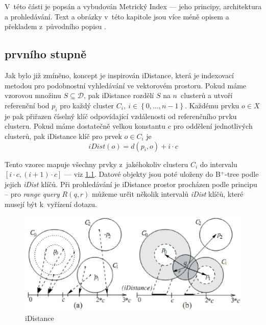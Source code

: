 \chapter{\MIndex{}}

V~této části je popsán a vybudován Metrický Index --- jeho principy, architektura a prohledávání.
Text a obrázky v~této kapitole jsou více méně opisem a překladem z~původního popisu \cite{Novak:2009:MIE:1637863.1638184}.

\section{\MIndex{} prvního stupně}

Jak bylo již zmíněno, koncept  je inspirován iDistance, která je indexovací metodou pro podobnostní vyhledávání ve vektorovém prostoru.
Pokud máme vzorovou množinu $S\subseteq\mathbb{\mathcal{D}}$, pak iDistance rozdělí $S$ na $n$~clusterů a utvoří referenční bod $p_{i}$ pro každý cluster $C_{i},\: i\in\left\{ 0,\ldots,n-1\right\} $.
Každému prvku $o\in X$ je pak přiřazen číselný klíč odpovídající vzdálenosti od referenčního prvku clusteru.
Pokud máme dostatečně velkou konstantu $c$ pro oddělení jednotlivých clusterů, pak iDistance klíč pro prvek
$o\in C_{i}$ je
\[
iDist(o)=d(p_{i},o)+i\cdot c
\]


Tento vzorec mapuje všechny prvky z~jakéhokoliv clusteru $C_{i}$
do intervalu $[i\cdot c,(i+1)\cdot c]$ --- viz \ref{fig:iDistance}\@.
Datové objekty jsou poté uloženy do B$^{+}$-tree podle jejich \emph{iDist
}klíčů. Při prohledávání je iDistance prostor procházen podle principu
-- pro \emph{range query} $R(q,r)$ můžeme určit několik intervalů
\emph{iDist} klíčů, které musejí být k~vyřízení dotazu. %

\begin{figure}[t]
\center
\includegraphics[clip,scale=0.4]{idistance}

\caption{iDistance}
\label{fig:iDistance}
\end{figure}

